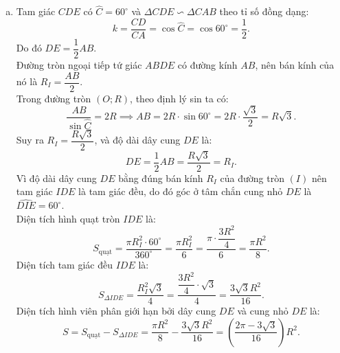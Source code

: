 \begin{bt}
{\begin{enumerate}[a)]
	Tứ giác $AKBH$ có hai cặp cạnh đối song song nên là một hình bình hành.\\
	Vì $I$ là trung điểm của đường chéo $AB$ của hình bình hành $AKBH$, nên $I$ cũng là trung điểm của đường chéo thứ hai $HK$.\\
	Do đó ba điểm $H, I, K$ thẳng hàng.
	\item Tam giác $CDE$ có $\widehat{C} = 60^\circ$ và $\Delta CDE \backsim \Delta CAB$ theo tỉ số đồng dạng:
	$$ k = \dfrac{CD}{CA} = \cos \widehat{C} = \cos 60^\circ = \dfrac{1}{2}. $$
	Do đó $DE = \dfrac{1}{2}AB$.\\
	Đường tròn ngoại tiếp tứ giác $ABDE$ có đường kính $AB$, nên bán kính của nó là $R_I = \dfrac{AB}{2}$.\\
	Trong đường tròn $(O; R)$, theo định lý sin ta có:
	$$ \dfrac{AB}{\sin \widehat{C}} = 2R \implies AB = 2R \cdot \sin 60^\circ = 2R \cdot \dfrac{\sqrt{3}}{2} = R\sqrt{3}. $$
	Suy ra $R_I = \dfrac{R\sqrt{3}}{2}$, và độ dài dây cung $DE$ là:
	$$ DE = \dfrac{1}{2}AB = \dfrac{R\sqrt{3}}{2} = R_I. $$
	Vì độ dài dây cung $DE$ bằng đúng bán kính $R_I$ của đường tròn $(I)$ nên tam giác $IDE$ là tam giác đều, do đó góc ở tâm chắn cung nhỏ $DE$ là $\widehat{DIE} = 60^\circ$.\\
	Diện tích hình quạt tròn $IDE$ là:
	$$ S_{\text{quạt}} = \dfrac{\pi R_I^2 \cdot 60^\circ}{360^\circ} = \dfrac{\pi R_I^2}{6} = \dfrac{\pi \cdot \dfrac{3R^2}{4}}{6} = \dfrac{\pi R^2}{8}. $$
	Diện tích tam giác đều $IDE$ là:
	$$ S_{\Delta IDE} = \dfrac{R_I^2\sqrt{3}}{4} = \dfrac{\dfrac{3R^2}{4} \cdot \sqrt{3}}{4} = \dfrac{3\sqrt{3}R^2}{16}. $$
	Diện tích hình viên phân giới hạn bởi dây cung $DE$ và cung nhỏ $DE$ là:
	$$ S = S_{\text{quạt}} - S_{\Delta IDE} = \dfrac{\pi R^2}{8} - \dfrac{3\sqrt{3}R^2}{16} = \left(\dfrac{2\pi - 3\sqrt{3}}{16}\right)R^2. $$
\end{enumerate}
}
\end{bt}
